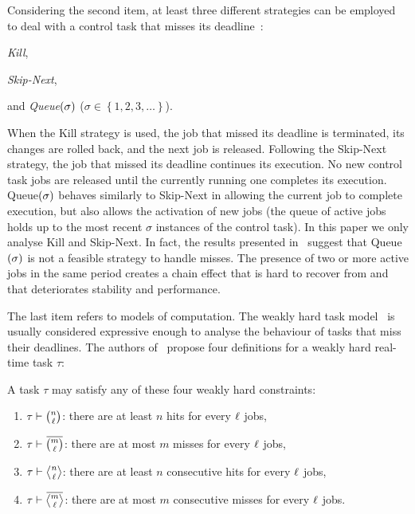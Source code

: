 Considering the second item, at least three different strategies can be employed to deal with a control task that misses its deadline~\cite{Cervin:2005}:
\begin{enumerate*}[label=(\roman*)]
    \item \emph{Kill},
    \item \emph{Skip-Next},
    \item and \emph{Queue$\left( \sigma \right)$} ($\sigma \in \left\{ 1, 2, 3, \ldots \right\}$).
\end{enumerate*}
%
When the Kill strategy is used, the job that missed its deadline is terminated, its changes are rolled back, and the next job is released.
Following the Skip-Next strategy, the job that missed its deadline continues its execution.
No new control task jobs are released until the currently running one completes its execution.
Queue$\left( \sigma \right)$ behaves similarly to Skip-Next in allowing the current job to complete execution, but also allows the activation of new jobs (the queue of active jobs holds up to the most recent $\sigma$ instances of the control task).
In this paper we only analyse Kill and Skip-Next.
In fact, the results presented in~\cite{Cervin:2005,Maggio:2020} suggest that Queue$\left( \sigma \right)$ is not a feasible strategy to handle misses.
The presence of two or more active jobs in the same period creates a chain effect that is hard to recover from and that deteriorates stability and performance.

The last item refers to models of computation.
The weakly hard task model~\cite{Hamdaoui:1995, Bernat:2001} is usually considered expressive enough to analyse the behaviour of tasks that miss their deadlines.
The authors of~\cite{Bernat:2001} propose four definitions for a weakly hard real-time task $\tau$:
\begin{definition}%
    \label{def:wh-models}%
    A task $\tau$ may satisfy any of these four weakly hard constraints:
    \begin{enumerate}[label=(\roman*)]
        \item $\tau \vdash \binom{n}{\!\:\!\:\ell\!\:\!\:}$: there are at least $n$ hits for every $\ell$ jobs,
        \item $\tau \vdash \overbar{\binom{m}{\numtotalanalysed}}$: there are at most $m$ misses for every $\ell$ jobs, 
        \item $\tau \vdash \genfrac{<}{>}{0pt}{}{n}{\!\:\!\:\numtotalanalysed\!\:\!\:}$: there are at least $n$ consecutive hits for every $\ell$ jobs,
        \item $\tau \vdash \overbar{\genfrac{<}{>}{0pt}{}{m}{\numtotalanalysed}}$: there are at most $m$ consecutive misses for every $\ell$ jobs.
    \end{enumerate}
\end{definition}

